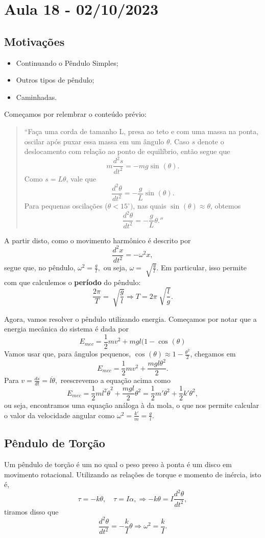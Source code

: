 \documentclass[PhysicsII/physicsII_notes.tex]{subfiles}
\begin{document}
\section{Aula 18 - 02/10/2023}
\subsection{Motivações}
\begin{itemize}
	\item Continuando o Pêndulo Simples;
	\item Outros tipos de pêndulo;
	\item Caminhadas.
\end{itemize}
Começamos por relembrar o conteúdo prévio:
\begin{quote}``Faça uma corda de tamanho L, presa ao teto e com uma massa na ponta, oscilar após puxar essa massa em um ângulo \(\theta \).
	Caso \(s\) denote o deslocamento com relação ao ponto de equilíbrio, então segue que
	\[
		m \frac{d^{2}s}{dt^{2}} = -mg\sin^{}{(\theta )}.
	\]
	Como \(s = L\theta \), vale que
	\[
		\frac{d^{2}\theta }{dt^{2}}=-\frac{g}{L}\sin^{}{(\theta )}.
	\]
	Para pequenas oscilações (\(\theta < 15^{\circ})\), nas quais \(\sin^{}{(\theta )}\approx \theta \), obtemos
	\[
		\frac{d^{2}\theta }{dt^{2}} = -\frac{g}{L}\theta .''
	\]
\end{quote}
A partir disto, como o movimento harmônico é descrito por
\[
	\frac{d^{2}x}{dt^{2}}=-\omega^{2}x,
\]
segue que, no pêndulo, \(\omega^{2}=\frac{g}{l},\) ou seja, \(\omega = \sqrt[]{\frac{g}{l}}.\)
Em particular, isso permite com que calculemos o \textbf{período} do pêndulo:
\[
	\frac{2\pi }{T} = \sqrt[]{\frac{g}{l}} \Rightarrow T = 2\pi \sqrt[]{\frac{l}{g}}.
\]

Agora, vamos resolver o pêndulo utilizando energia. Começamos por notar que a energia mecânica do sistema é dada por
\[
	E_{mec} = \frac{1}{2}mv^{2} + mgl(1-\cos^{}{(\theta )}
\]
Vamos usar que, para ângulos pequenos, \(\cos^{}{(\theta )}\approx 1-\frac{\theta ^{2}}{2} \), chegamos em
\[
	E_{mec} = \frac{1}{2}mv^{2}+\frac{mgl\theta ^{2}}{2}.
\]
Para \(v=\frac{ds}{dt} = l\dot \theta ,\) reescrevemo a equação acima como
\[
	E_{mec} = \frac{1}{2}ml^{2}\dot\theta ^{2} + \frac{mgl}{2}\theta^{2} = \frac{1}{2}m'\theta ^{2} + \frac{1}{2}k'\theta ^{2},
\]
ou seja, encontramos uma equação análoga à da mola, o que nos permite calcular o valor da velocidade angular como \(\omega^{2}=\frac{k'}{m} = \frac{g}{l}.\)
\subsection{Pêndulo de Torção}
Um pêndulo de torção é um no qual o peso preso à ponta é um disco em movimento rotacional. Utilizando as relações de torque e momento de inércia, isto é,
\[
	\tau = -k\theta, \quad \tau = I\alpha, \Rightarrow -k\theta = I \frac{d^{2}\theta }{dt^{2}},
\]
tiramos disso que
\[
	\frac{d^{2}\theta }{dt^{2}} = - \frac{k}{I}\theta \Rightarrow \omega^{2} = \frac{k}{I}.
\]
\end{document}
